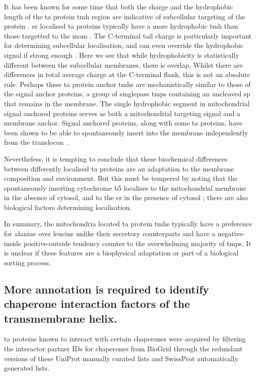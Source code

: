 It has been known for some time that both the charge and the hydrophobic length of the \gls{ta} protein \gls{tmh} region are indicative of subcellular targeting of the protein \cite{Borgese2007}.
\gls{er} localised \gls{ta} proteins typically have a more hydrophobic \gls{tmh} than those targetted to the \gls{mom} \cite{Wang2010}.
The C\--terminal tail charge is particularly important for determining subcellular localisation, and can even override the hydrophobic signal if strong enough \cite{Costello2017}.
Here we see that while hydrophobicity is statistically different between the subcellular membranes, there is overlap.
Whilst there are differences in total average charge at the C\--terminal flank, this is not an absolute rule.
Perhaps these \gls{ta} protein anchor \gls{tmh}s are mechanistically similar to those of the signal anchor proteins, a group of singlepass \gls{tmp}s containing an uncleaved \gls{sp} that remains in the membrane.
The single hydrophobic segment in mitochondrial signal anchored proteins serves as both a mitochondrial targeting signal and a membrane anchor.
Signal anchored proteins, along with some \gls{ta} proteins, have been shown to be able to spontaneously insert into the membrane independently from the translocon~\cite{Elisa2012, Lan2000, Colombo2009}.

Nevertheless, it is tempting to conclude that these biochemical differences between differently localised \gls{ta} proteins are an adaptation to the membrane composition and environment.
But this must be tempered by noting that the spontaneously inserting cytochrome b5 localises to the mitochondrial membrane in the absence of cytosol, and to the \gls{er} in the presence of cytosol \cite{Costa2018}; there are also biological factors determining localisation.

In summary, the mitochondria located \gls{ta} protein \gls{tmh}s typically have a preference for alanine over leucine unlike their secretory counterparts and have a negative\--inside positive\--outside tendency counter to the overwhelming majority of \gls{tmp}s.
It is unclear if these features are a biophysical adaptation or part of a biological sorting process.

\subsection{More annotation is required to identify chaperone interaction factors of the transmembrane helix.}

\gls{ta} proteins known to interact with certain chaperones were acquired by filtering the interactor partner IDs for chaperones from BioGrid through the redundant versions of these UniProt manually curated lists and SwissProt automatically generated lists.

